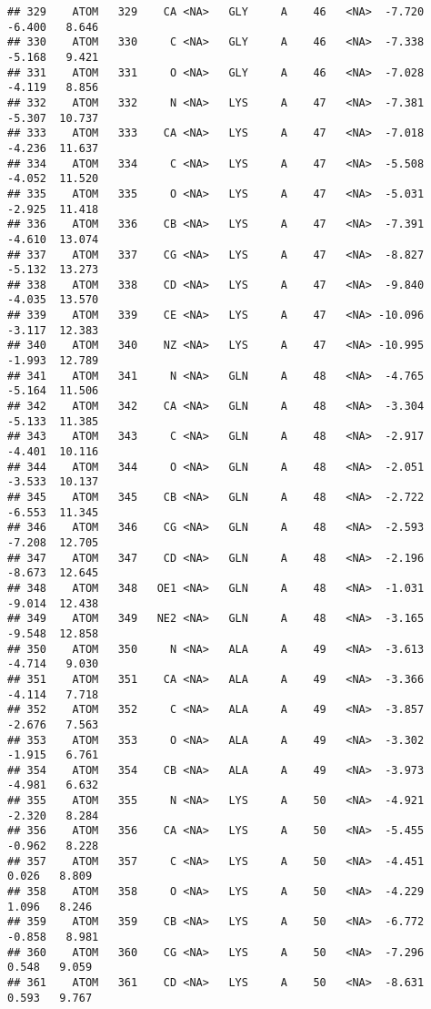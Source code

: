 \documentclass[
]{article}
\begin{document}
\begin{verbatim}
## 329    ATOM   329    CA <NA>   GLY     A    46   <NA>  -7.720  -6.400   8.646
## 330    ATOM   330     C <NA>   GLY     A    46   <NA>  -7.338  -5.168   9.421
## 331    ATOM   331     O <NA>   GLY     A    46   <NA>  -7.028  -4.119   8.856
## 332    ATOM   332     N <NA>   LYS     A    47   <NA>  -7.381  -5.307  10.737
## 333    ATOM   333    CA <NA>   LYS     A    47   <NA>  -7.018  -4.236  11.637
## 334    ATOM   334     C <NA>   LYS     A    47   <NA>  -5.508  -4.052  11.520
## 335    ATOM   335     O <NA>   LYS     A    47   <NA>  -5.031  -2.925  11.418
## 336    ATOM   336    CB <NA>   LYS     A    47   <NA>  -7.391  -4.610  13.074
## 337    ATOM   337    CG <NA>   LYS     A    47   <NA>  -8.827  -5.132  13.273
## 338    ATOM   338    CD <NA>   LYS     A    47   <NA>  -9.840  -4.035  13.570
## 339    ATOM   339    CE <NA>   LYS     A    47   <NA> -10.096  -3.117  12.383
## 340    ATOM   340    NZ <NA>   LYS     A    47   <NA> -10.995  -1.993  12.789
## 341    ATOM   341     N <NA>   GLN     A    48   <NA>  -4.765  -5.164  11.506
## 342    ATOM   342    CA <NA>   GLN     A    48   <NA>  -3.304  -5.133  11.385
## 343    ATOM   343     C <NA>   GLN     A    48   <NA>  -2.917  -4.401  10.116
## 344    ATOM   344     O <NA>   GLN     A    48   <NA>  -2.051  -3.533  10.137
## 345    ATOM   345    CB <NA>   GLN     A    48   <NA>  -2.722  -6.553  11.345
## 346    ATOM   346    CG <NA>   GLN     A    48   <NA>  -2.593  -7.208  12.705
## 347    ATOM   347    CD <NA>   GLN     A    48   <NA>  -2.196  -8.673  12.645
## 348    ATOM   348   OE1 <NA>   GLN     A    48   <NA>  -1.031  -9.014  12.438
## 349    ATOM   349   NE2 <NA>   GLN     A    48   <NA>  -3.165  -9.548  12.858
## 350    ATOM   350     N <NA>   ALA     A    49   <NA>  -3.613  -4.714   9.030
## 351    ATOM   351    CA <NA>   ALA     A    49   <NA>  -3.366  -4.114   7.718
## 352    ATOM   352     C <NA>   ALA     A    49   <NA>  -3.857  -2.676   7.563
## 353    ATOM   353     O <NA>   ALA     A    49   <NA>  -3.302  -1.915   6.761
## 354    ATOM   354    CB <NA>   ALA     A    49   <NA>  -3.973  -4.981   6.632
## 355    ATOM   355     N <NA>   LYS     A    50   <NA>  -4.921  -2.320   8.284
## 356    ATOM   356    CA <NA>   LYS     A    50   <NA>  -5.455  -0.962   8.228
## 357    ATOM   357     C <NA>   LYS     A    50   <NA>  -4.451   0.026   8.809
## 358    ATOM   358     O <NA>   LYS     A    50   <NA>  -4.229   1.096   8.246
## 359    ATOM   359    CB <NA>   LYS     A    50   <NA>  -6.772  -0.858   8.981
## 360    ATOM   360    CG <NA>   LYS     A    50   <NA>  -7.296   0.548   9.059
## 361    ATOM   361    CD <NA>   LYS     A    50   <NA>  -8.631   0.593   9.767

\end{verbatim}
\end{document}
